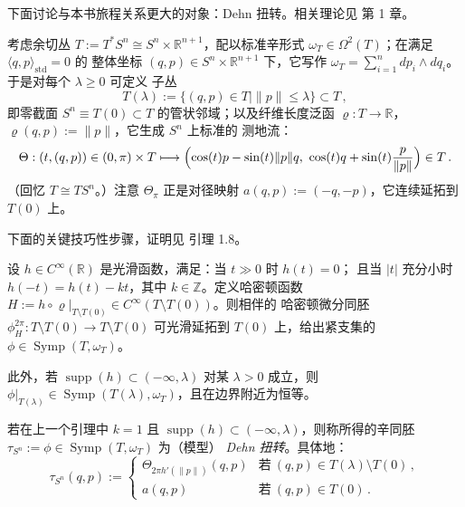 
下面讨论与本书旅程关系更大的对象：Dehn 扭转。相关理论见 \cite{Sei02}
第 1 章。

\begin{Def}\label{def:6.19}
考虑余切丛 $T:=T^*S^n\cong S^n\times\mathbb R^{n+1}$，配以标准辛形式
$\omega_T\in\Omega^2(T)$；在满足 $\langle q,p\rangle_{\mathrm{std}}=0$ 的
整体坐标 $(q,p)\in S^n\times\mathbb R^{n+1}$ 下，它写作
$\omega_T=\sum_{i=1}^{n}dp_i\wedge dq_i$。于是对每个 $\lambda\ge 0$ 可定义
子丛
\[
T(\lambda):=\{(q,p)\in T\mid \|p\|\le\lambda\}\subset T\,,
\]
即零截面 $S^n\equiv T(0)\subset T$ 的管状邻域；以及纤维长度泛函
$\varrho:T\to\mathbb R$，$\varrho(q,p):=\|p\|$，它生成 $S^n$ 上标准的
测地流：
\[
\Theta:(t,(q,p))\in(0,\pi)\times T\longmapsto
\Bigl(\cos(t)p-\sin(t)\|p\|q,\ \cos(t)q+\sin(t)\frac{p}{\|p\|}\Bigr)\in T\,.
\]
（回忆 $T\cong TS^n$。）注意 $\Theta_\pi$ 正是对径映射
$a(q,p):=(-q,-p)$，它连续延拓到 $T(0)$ 上。
\end{Def}


下面的关键技巧性步骤，证明见 \cite{Sei02} 引理 1.8。

\begin{Lem}\label{lem:6.20}
设 $h\in C^\infty(\mathbb R)$ 是光滑函数，满足：当 $t\gg 0$ 时 $h(t)=0$；
且当 $|t|$ 充分小时 $h(-t)=h(t)-kt$，其中 $k\in\mathbb Z$。定义哈密顿函数
$H:=h\circ\varrho|_{T\setminus T(0)}\in C^\infty(T\setminus T(0))$。则相伴的
哈密顿微分同胚
$\phi^{2\pi}_H:T\setminus T(0)\to T\setminus T(0)$ 可光滑延拓到 $T(0)$
上，给出紧支集的 $\phi\in\operatorname{Symp}(T,\omega_T)$。

此外，若 $\operatorname{supp}(h)\subset(-\infty,\lambda)$ 对某
$\lambda>0$ 成立，则 $\phi|_{T(\lambda)}\in\operatorname{Symp}(T(\lambda),
\omega_T)$，且在边界附近为恒等。
\end{Lem}

\begin{Def}\label{def:6.21}
若在上一个引理中 $k=1$ 且
$\operatorname{supp}(h)\subset(-\infty,\lambda)$，则称所得的辛同胚
$\tau_{S^n}:=\phi\in\operatorname{Symp}(T,\omega_T)$ 为（模型）
\emph{Dehn 扭转}。具体地：
\begin{equation}
\tau_{S^n}(q,p):=
\begin{cases}
\Theta_{2\pi h'(\|p\|)}(q,p) & \text{若}\ (q,p)\in T(\lambda)\setminus T(0)\,,\\
a(q,p) & \text{若}\ (q,p)\in T(0)\,.
\end{cases}
\label{eq:6.90}
\end{equation}
\end{Def}

